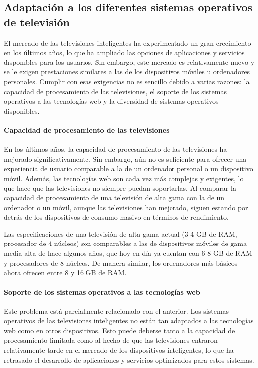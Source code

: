\subsection{Adaptación a los diferentes sistemas operativos de televisión}
\label{sec:adaptacion_introduccion}

El mercado de las televisiones inteligentes ha experimentado un gran crecimiento en los últimos años, lo que ha ampliado 
las opciones de aplicaciones y servicios disponibles para los usuarios. Sin embargo, este mercado es relativamente nuevo y 
se le exigen prestaciones similares a las de los dispositivos móviles u ordenadores personales. Cumplir con esas exigencias 
no es sencillo debido a varias razones: la capacidad de procesamiento de las televisiones, el soporte de los sistemas operativos 
a las tecnologías web y la diversidad de sistemas operativos disponibles.

\paragraph{Capacidad de procesamiento de las televisiones}
En los últimos años, la capacidad de procesamiento de las televisiones ha mejorado significativamente. Sin embargo, 
aún no es suficiente para ofrecer una experiencia de usuario comparable a la de un ordenador personal o un dispositivo móvil. 
Además, las tecnologías web son cada vez más complejas y exigentes, lo que hace que las televisiones no siempre puedan 
soportarlas. Al comparar la capacidad de procesamiento de una televisión de alta gama con la de un ordenador o un móvil, 
aunque las televisiones han mejorado, siguen estando por detrás de los dispositivos de consumo masivo en términos de rendimiento.

Las especificaciones de una televisión de alta gama actual (3-4 GB de RAM, procesador de 4 núcleos) son comparables a las de 
dispositivos móviles de gama media-alta de hace algunos años, que hoy en día ya cuentan con 6-8 GB de RAM y procesadores 
de 8 núcleos. De manera similar, los ordenadores más básicos ahora ofrecen entre 8 y 16 GB de RAM.

\paragraph{Soporte de los sistemas operativos a las tecnologías web}
Este problema está parcialmente relacionado con el anterior. Los sistemas operativos de las televisiones inteligentes no están 
tan adaptados a las tecnologías web como en otros dispositivos. Esto puede deberse tanto a la capacidad de procesamiento limitada 
como al hecho de que las televisiones entraron relativamente tarde en el mercado de los dispositivos inteligentes, lo que ha 
retrasado el desarrollo de aplicaciones y servicios optimizados para estos sistemas.

